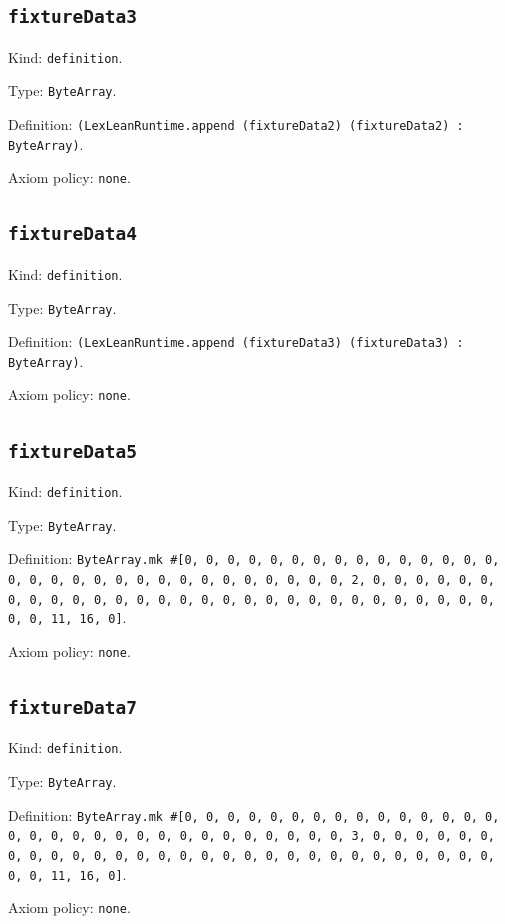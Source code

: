 \documentclass[11pt]{article}
\begin{document}
\subsection*{\texttt{fixtureData3}}
\noindent Kind: \texttt{definition}.\par
\noindent Type: \texttt{ByteArray}.\par
\noindent Definition: \texttt{(LexLeanRuntime.append (fixtureData2) (fixtureData2) : ByteArray)}.\par
\noindent Axiom policy: \texttt{none}.\par
\subsection*{\texttt{fixtureData4}}
\noindent Kind: \texttt{definition}.\par
\noindent Type: \texttt{ByteArray}.\par
\noindent Definition: \texttt{(LexLeanRuntime.append (fixtureData3) (fixtureData3) : ByteArray)}.\par
\noindent Axiom policy: \texttt{none}.\par
\subsection*{\texttt{fixtureData5}}
\noindent Kind: \texttt{definition}.\par
\noindent Type: \texttt{ByteArray}.\par
\noindent Definition: \texttt{ByteArray.mk \#[0, 0, 0, 0, 0, 0, 0, 0, 0, 0, 0, 0, 0, 0, 0, 0, 0, 0, 0, 0, 0, 0, 0, 0, 0, 0, 0, 0, 0, 0, 0, 2, 0, 0, 0, 0, 0, 0, 0, 0, 0, 0, 0, 0, 0, 0, 0, 0, 0, 0, 0, 0, 0, 0, 0, 0, 0, 0, 0, 0, 0, 0, 0, 11, 16, 0]}.\par
\noindent Axiom policy: \texttt{none}.\par
\subsection*{\texttt{fixtureData7}}
\noindent Kind: \texttt{definition}.\par
\noindent Type: \texttt{ByteArray}.\par
\noindent Definition: \texttt{ByteArray.mk \#[0, 0, 0, 0, 0, 0, 0, 0, 0, 0, 0, 0, 0, 0, 0, 0, 0, 0, 0, 0, 0, 0, 0, 0, 0, 0, 0, 0, 0, 0, 0, 3, 0, 0, 0, 0, 0, 0, 0, 0, 0, 0, 0, 0, 0, 0, 0, 0, 0, 0, 0, 0, 0, 0, 0, 0, 0, 0, 0, 0, 0, 0, 0, 11, 16, 0]}.\par
\noindent Axiom policy: \texttt{none}.\par
\end{document}
